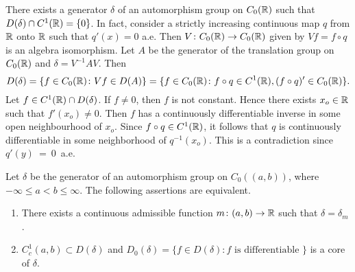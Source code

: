 \begin{example}\label{ex:b2-3.22}
%
There exists a generator $\delta$ of an automorphism group on $C_{0}(\mathbb{R})$ such that $D(\delta) \cap C^{1}(\mathbb{R}) = \{0\}$.
In fact, consider a strictly increasing continuous map $q$ from $\mathbb{R}$ onto $\mathbb{R}$ such that
$q'(x) = 0$ a.e.
Then $V \colon C_{0}(\mathbb{R}) \to C_{0}(\mathbb{R})$ given by $Vf = f \circ q$ is an algebra isomorphism.
Let $A$ be the generator of the translation group on $C_{0}(\mathbb{R})$ and $\delta = V^{-1}AV$.
Then 
\[
D(\delta) = \{ f \in C_{0}(\mathbb{R}) \colon Vf \in D(A)\} = \{f \in C_{0}(\mathbb{R}) \colon f \circ q \in C^{1}(\mathbb{R}), (f \circ q)' \in C_{0}(\mathbb{R}) \}.
\]
Let $f \in C^{1}(\mathbb{R}) \cap D(\delta)$.
If $f \neq 0$, then $f$ is not constant.
Hence there exists $x_{o} \in \mathbb{R}$ such that $f'(x_{o}) \neq 0$.
Then $f$ has a continuously differentiable inverse in some open neighbourhood of $x_{o}$.
Since $f \circ q \in C^{1}(\mathbb{R})$, it follows that $q$ is continuously differentiable in some neighborhood of $q^{-1}(x_{o})$.
This is a contradiction since $q'(y)~=~0$~a.e.
\end{example}
\begin{theorem}\label{thm:b2-3.23}
%
Let $\delta$ be the generator of an automorphism group on $C_{0}((a,b))$, where $-\infty \leq a < b \leq \infty$.
The following assertions are equivalent.
\begin{enumerate}[\upshape (a)]
\item \label{thm:b2-3.23-1} 
There exists a continuous admissible function $m \colon (a,b) \to \mathbb{R}$ such that $\delta = \delta_{m}$.
\item \label{thm:b2-3.23-2}
$C_{c}^{1}(a,b) \subset D(\delta)$ and $D_{0}(\delta) = \{ f \in D(\delta) \colon f \text{ is differentiable } \}$ is a core of $\delta$.
\end{enumerate}
\end{theorem}
